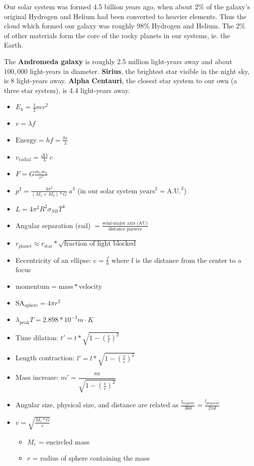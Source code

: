 Our solar system was formed 4.5 billion years ago, when about $2\%$ of the galaxy's original Hydrogen and Helium had been converted to heavier elements. Thus the cloud which formed our galaxy was roughly $98\%$ Hydrogen and Helium. The $2\%$ of other materials form the core of the rocky planets in our systems, ie. the Earth.

The {\bf Andromeda galaxy} is roughly 2.5 million light-years away and about $100,000$ light-years in diameter. {\bf Sirius}, the brightest star visible in the night sky, is 8 light-years away. {\bf Alpha Centauri}, the closest star system to our own (a three star system), is 4.4 light-years away.

\begin{itemize}
\item $E_k = \frac{1}{2}mv^2$
\item $v = \lambda f$
\item $\text{Energy} = h f = \frac{hc}{\lambda}$
\item $v_\text{radial} = \frac{\Delta \lambda}{\lambda}\ c$
\item $F = G\frac{m_1 m_2}{r^2}$
\item $p^2 = \frac{4\pi^2}{(M_1 + M_2) * G}\ a^3$ (in our solar system $\text{years}^2 = \text{A.U.}^3$)
\item $L = 4\pi^2R^2 \sigma_{SB} T^4$
\item Angular separation (rad) $= \frac{\text{semi-major axis (AU)}}{\text{distance parsecs}}$
\item $r_\text{planet} \approx r_\text{star} * \sqrt{\text{fraction of light blocked}}$
\item Eccentricity of an ellipse: $e = \frac{f}{a}$ where f is the distance from the center to a focus
\item $\text{momentum} = \text{mass} * \text{velocity}$
\item $\text{SA}_\text{sphere} = 4 \pi r^2$
\item $\lambda_\text{peak} T = 2.898 * 10^{-3} m \cdot K$
\item Time dilation: $t' = t * \sqrt{1 - \left( \frac{v}{c} \right)^2}$
\item Length contraction: $l' = l * \sqrt{1 - \left( \frac{v}{c} \right)^2}$
\item Mass increase: $m' = \dfrac{m}{\sqrt{1 - \left( \frac{v}{c} \right)^2}}$
\item Angular size, physical size, and distance are related as $\frac{l_{angular}}{360} = \frac{l_{physical}}{2\pi d}$
\item $v = \sqrt{\frac{M_r * G}{r}}$
\begin{itemize}
    \item $M_r$ = encircled mass
    \item $r$ = radius of sphere containing the mass
\end{itemize}
\end{itemize}



